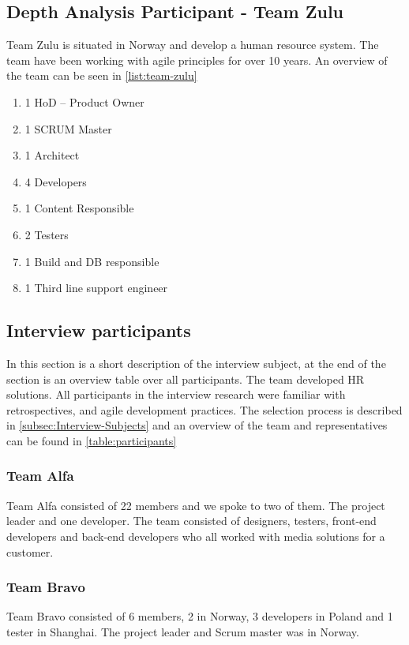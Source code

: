 \subsection{Depth Analysis Participant - Team Zulu}
\label{section:team-zulu-description}
Team Zulu is situated in Norway and develop a human resource system. The team have been working with agile principles for over 10 years. An overview of the team can be seen in \autoref{list:team-zulu}

 \begin{enumerate}
 \label{list:team-zulu}
	\item 1 HoD – Product Owner 
	\item 1 SCRUM Master
	\item 1 Architect
	\item 4 Developers
	\item 1 Content Responsible
	\item 2 Testers
	\item 1 Build and DB responsible
	\item 1 Third line support engineer
\end{enumerate} 

\subsection{Interview participants}
In this section is a short description of the interview subject, at the end of the section is an overview table over all participants. The team developed HR solutions. All participants in the interview research were familiar with retrospectives, and agile development practices. The selection process is described in \autoref{subsec:Interview-Subjects} and an overview of the team and representatives can be found in \autoref{table:participants}

\subsubsection{Team Alfa}
Team Alfa consisted of 22 members and we spoke to two of them. The project leader and one developer. The team consisted of designers, testers, front-end developers and back-end developers who all worked with media solutions for a customer. 

\subsubsection{Team Bravo}
Team Bravo consisted of 6 members, 2 in Norway, 3 developers in Poland and 1 tester in Shanghai. The project leader and  Scrum master was in Norway. 

